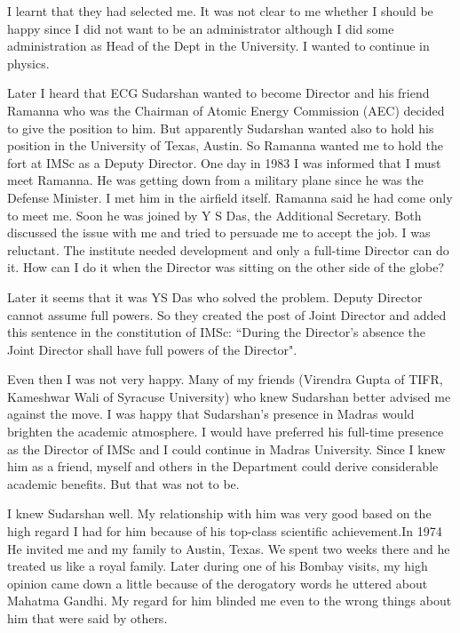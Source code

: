 I learnt that they had selected me. It was not clear to me whether I 
should be happy since I did not want to be an admini\-strator although I 
did some administration as Head of the Dept in the University. I wanted 
to continue in physics.

Later I heard that ECG Sudarshan wanted to become Director and his 
friend Ramanna who was the Chairman of Atomic Energy Commission (AEC) 
decided to give the position to him. But apparently Sudarshan wanted 
also to hold his position in the University of Texas, Austin. So Ramanna 
wanted me to hold the fort at IMSc as a Deputy Director.
\vskip 1pt
One day in 1983 I was informed that I must meet Ramanna. He was getting 
down from a military plane since he was the Defense Minister. I met him 
in the airfield itself. Ramanna said he had come only to meet me. Soon 
he was joined by Y S Das, the Additional Secretary. Both discussed the 
issue with me and tried to persuade me to accept the job. I was 
reluctant. The institute needed development and only a full-time 
Director can do it. How can I do it when the Director was sitting on the 
other side of the globe?

Later it seems that it was YS Das who solved the problem. Deputy 
Director cannot assume full powers. So they created the post of Joint 
Director and added this sentence in the constitution of IMSc: ``During 
the Director's absence the Joint Director shall have full powers of the 
Director".

Even then I was not very happy. Many of my friends (Vi\-rendra Gupta of 
TIFR, Kameshwar Wali of Syracuse University) who knew Sudarshan better 
advised me against the move. I was happy that Sudarshan's presence in 
Madras would brighten the academic atmosphere. I would have preferred 
his full-time pre\-sence as the Director of IMSc and I could continue in 
Madras University. Since I knew him as a friend, myself and others in 
the Department could derive considerable academic benefits. But that was 
not to be.

I knew Sudarshan well. My relationship with him was very good based on 
the high regard I had for him because of his top-class scientific 
achievement.In 1974 He invited me and my fa\-mily to Austin, Texas. We 
spent two weeks there and he treated us like a royal family. Later 
during one of his Bombay visits, my high opinion came down a little 
because of the derogatory words he uttered about Mahatma Gandhi. My 
regard for him blinded me even to the wrong things about him that were 
said by others.

